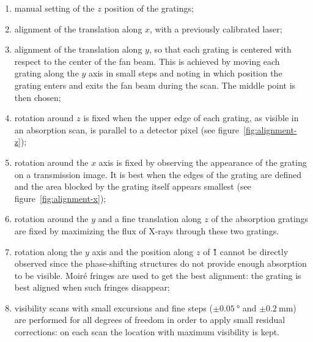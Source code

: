 \begin{enumerate}
    \item manual setting of the $z$ position of the gratings;
    \item alignment of the translation along $x$, with a previously
        calibrated laser;
    \item alignment of the translation along $y$,
        so that each grating is centered with respect to the center of the
        fan beam. This is achieved by moving each grating along the $y$ axis
        in small steps and noting in which position the grating enters and
        exits the fan beam during the scan. The middle point is then
        chosen;
    \item rotation around $z$ is fixed when the upper edge of each grating,
        as visible in an absorption scan, is parallel to a detector
        pixel (see figure~\ref{fig:alignment-z});
    \item rotation around the $x$ axis is fixed by observing the appearance
        of the grating on a transmission image. It is best when the edges of
        the grating are defined and the area blocked by the grating itself
        appears smallest (see figure~\ref{fig:alignment-x});
    \item rotation around the $y$ and a fine translation along $z$ of the
        absorption gratings are fixed by maximizing the flux of X-rays
        through these two gratings.
    \item rotation along the $y$ axis and the position along $z$
        of \G{1} cannot be directly observed since the phase-shifting
        structures do not provide enough absorption to be visible.
        Moir\'e fringes are used to get the best alignment: the grating is
        best aligned when such fringes disappear;
    \item visibility scans with small excursions and fine steps
        ($\pm\SI{0.05}{\degree}$ and $\pm\SI{0.2}{\milli\meter}$) are
        performed for all degrees of freedom in order to apply small
        residual corrections: on each scan the location with maximum
        visibility is kept.
\end{enumerate}

